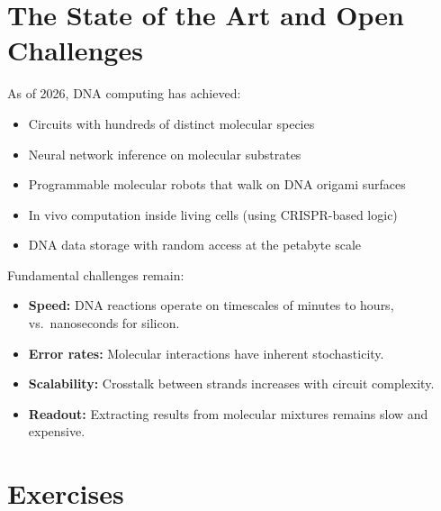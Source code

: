 \section{The State of the Art and Open Challenges}
\label{sec:dna-computing-sota}

As of 2026, DNA computing has achieved:
\begin{itemize}[leftmargin=1.8em]
  \item Circuits with hundreds of distinct molecular species
  \item Neural network inference on molecular substrates \citep{cherry2018}
  \item Programmable molecular robots that walk on DNA origami surfaces
  \item In vivo computation inside living cells (using CRISPR-based logic)
  \item DNA data storage with random access at the petabyte scale
\end{itemize}

Fundamental challenges remain:
\begin{itemize}[leftmargin=1.8em]
  \item \textbf{Speed:} DNA reactions operate on timescales of minutes to hours, vs.\ nanoseconds for silicon.
  \item \textbf{Error rates:} Molecular interactions have inherent stochasticity.
  \item \textbf{Scalability:} Crosstalk between strands increases with circuit complexity.
  \item \textbf{Readout:} Extracting results from molecular mixtures remains slow and expensive.
\end{itemize}

\section{Exercises}
\label{sec:ch2-exercises}

